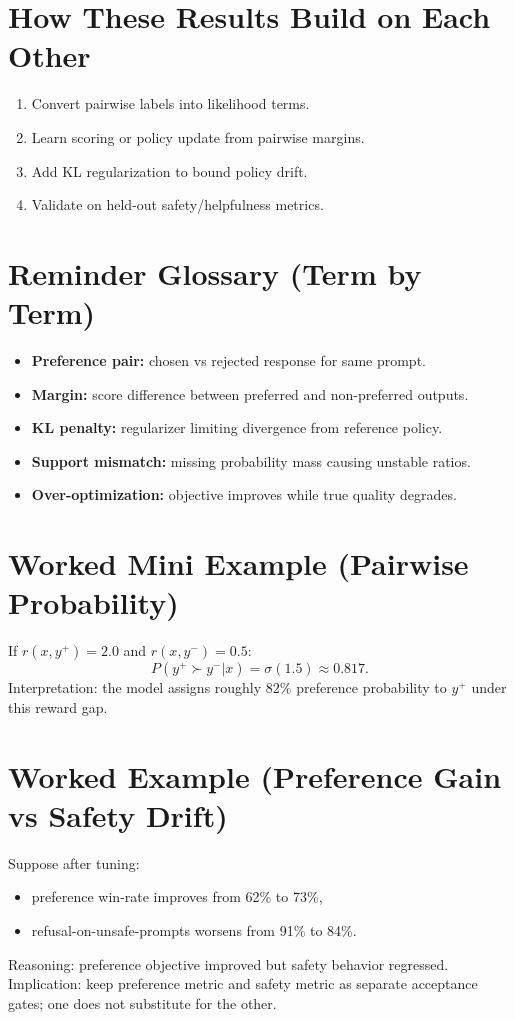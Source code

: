 \section*{How These Results Build on Each Other}
\begin{enumerate}[leftmargin=1.5em]
  \item Convert pairwise labels into likelihood terms.
  \item Learn scoring or policy update from pairwise margins.
  \item Add KL regularization to bound policy drift.
  \item Validate on held-out safety/helpfulness metrics.
\end{enumerate}

\section*{Reminder Glossary (Term by Term)}
\begin{itemize}[leftmargin=1.5em]
  \item \textbf{Preference pair:} chosen vs rejected response for same prompt.
  \item \textbf{Margin:} score difference between preferred and non-preferred outputs.
  \item \textbf{KL penalty:} regularizer limiting divergence from reference policy.
  \item \textbf{Support mismatch:} missing probability mass causing unstable ratios.
  \item \textbf{Over-optimization:} objective improves while true quality degrades.
\end{itemize}

\section*{Worked Mini Example (Pairwise Probability)}
If $r(x,y^+)=2.0$ and $r(x,y^-)=0.5$:
\[
P(y^+\succ y^-|x)=\sigma(1.5)\approx0.817.
\]
Interpretation: the model assigns roughly $82\%$ preference probability to $y^+$ under this reward gap.

\section*{Worked Example (Preference Gain vs Safety Drift)}
Suppose after tuning:
\begin{itemize}[leftmargin=1.5em]
  \item preference win-rate improves from 62\% to 73\%,
  \item refusal-on-unsafe-prompts worsens from 91\% to 84\%.
\end{itemize}
Reasoning: preference objective improved but safety behavior regressed.  
Implication: keep preference metric and safety metric as separate acceptance gates; one does not substitute for the other.

